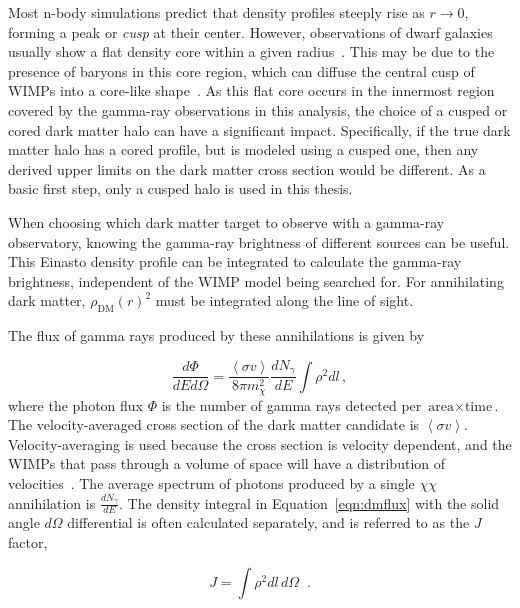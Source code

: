     
    Most n-body simulations predict that density profiles steeply rise as $r \rightarrow 0$, forming a peak or \textit{cusp} at their center.
    However, observations of dwarf galaxies usually show a flat density core within a given radius~\cite{flores1994observational,CoreVsCusp}.
    This may be due to the presence of baryons in this core region, which can diffuse the central cusp of WIMPs into a core-like shape~\cite{corecusp_baryondiffuse1,corecusp_baryondiffuse2}.
    As this flat core occurs in the innermost region covered by the gamma-ray observations in this analysis, the choice of a cusped or cored dark matter halo can have a significant impact.
    Specifically, if the true dark matter halo has a cored profile, but is modeled using a cusped one, then any derived upper limits on the dark matter cross section would be different.
    As a basic first step, only a cusped halo is used in this thesis.
    
    When choosing which dark matter target to observe with a gamma-ray observatory, knowing the gamma-ray brightness of different sources can be useful.
    This Einasto density profile can be integrated to calculate the gamma-ray brightness, independent of the WIMP model being searched for.
    For annihilating dark matter, $\rho_{\textrm{DM}}\left(r\right)^2$ must be integrated along the line of sight.
    
    The flux of gamma rays produced by these annihilations is given by
    
    \begin{equation}\label{eqn:dmflux}
      \frac{ d\Phi }{ dE d \Omega } = \frac{ \left \langle \sigma v \right \rangle }{8 \pi m_\chi^2} \frac{dN_{\gamma}}{dE} \int \rho^2 dl \, ,
    \end{equation}
    where the photon flux $\Phi$ is the number of gamma rays detected per $\textrm{area}\times\textrm{time}$.
    The velocity-averaged cross section of the dark matter candidate is $\left \langle \sigma v \right \rangle$.
    Velocity-averaging is used because the cross section is velocity dependent, and the WIMPs that pass through a volume of space will have a distribution of velocities~\cite{wimp_veldist}.
    The average spectrum of photons produced by a single $\chi\chi$ annihilation is $\frac{dN_{\gamma}}{dE}$.
    The density integral in Equation~\ref{eqn:dmflux} with the solid angle $d\Omega$ differential is often calculated separately, and is referred to as the $J$ factor,

    \begin{equation}\label{eqn:jfactor}
      J = \int \rho^2 dl\,d\Omega \;\; .
    \end{equation}

